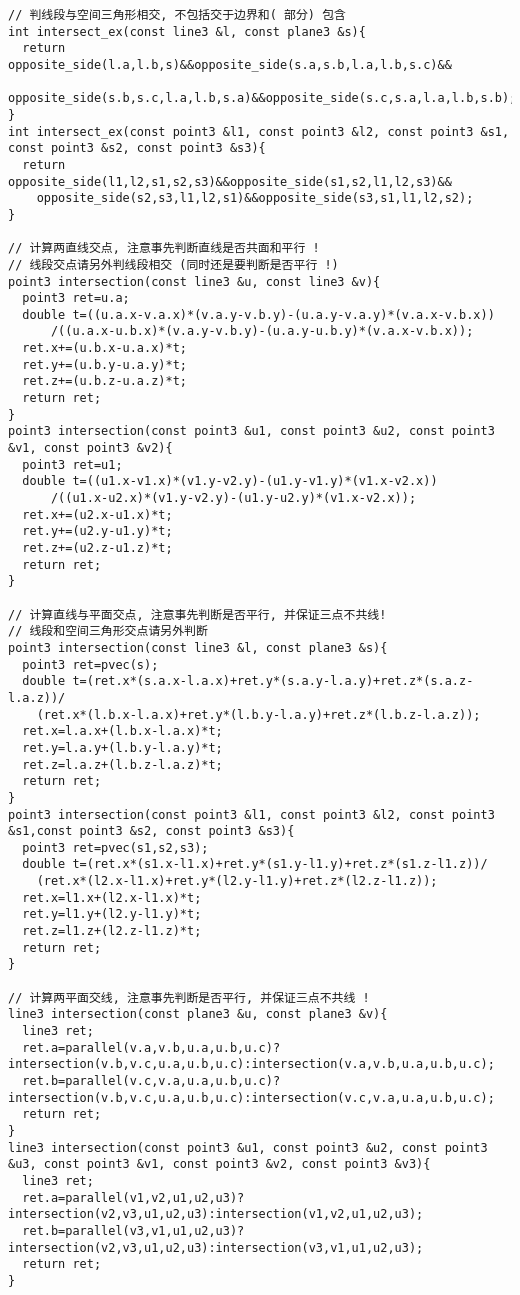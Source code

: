 \begin{lstlisting}[language={}]
// 判线段与空间三角形相交, 不包括交于边界和( 部分) 包含
int intersect_ex(const line3 &l, const plane3 &s){
  return opposite_side(l.a,l.b,s)&&opposite_side(s.a,s.b,l.a,l.b,s.c)&&
    opposite_side(s.b,s.c,l.a,l.b,s.a)&&opposite_side(s.c,s.a,l.a,l.b,s.b);
}
int intersect_ex(const point3 &l1, const point3 &l2, const point3 &s1, const point3 &s2, const point3 &s3){
  return opposite_side(l1,l2,s1,s2,s3)&&opposite_side(s1,s2,l1,l2,s3)&&
    opposite_side(s2,s3,l1,l2,s1)&&opposite_side(s3,s1,l1,l2,s2);
}

// 计算两直线交点, 注意事先判断直线是否共面和平行 !
// 线段交点请另外判线段相交 (同时还是要判断是否平行 !)
point3 intersection(const line3 &u, const line3 &v){
  point3 ret=u.a;
  double t=((u.a.x-v.a.x)*(v.a.y-v.b.y)-(u.a.y-v.a.y)*(v.a.x-v.b.x))
      /((u.a.x-u.b.x)*(v.a.y-v.b.y)-(u.a.y-u.b.y)*(v.a.x-v.b.x));
  ret.x+=(u.b.x-u.a.x)*t;
  ret.y+=(u.b.y-u.a.y)*t;
  ret.z+=(u.b.z-u.a.z)*t;
  return ret;
}
point3 intersection(const point3 &u1, const point3 &u2, const point3 &v1, const point3 &v2){
  point3 ret=u1;
  double t=((u1.x-v1.x)*(v1.y-v2.y)-(u1.y-v1.y)*(v1.x-v2.x))
      /((u1.x-u2.x)*(v1.y-v2.y)-(u1.y-u2.y)*(v1.x-v2.x));
  ret.x+=(u2.x-u1.x)*t;
  ret.y+=(u2.y-u1.y)*t;
  ret.z+=(u2.z-u1.z)*t;
  return ret;
}

// 计算直线与平面交点, 注意事先判断是否平行, 并保证三点不共线!
// 线段和空间三角形交点请另外判断
point3 intersection(const line3 &l, const plane3 &s){
  point3 ret=pvec(s);
  double t=(ret.x*(s.a.x-l.a.x)+ret.y*(s.a.y-l.a.y)+ret.z*(s.a.z-l.a.z))/
    (ret.x*(l.b.x-l.a.x)+ret.y*(l.b.y-l.a.y)+ret.z*(l.b.z-l.a.z));
  ret.x=l.a.x+(l.b.x-l.a.x)*t;
  ret.y=l.a.y+(l.b.y-l.a.y)*t;
  ret.z=l.a.z+(l.b.z-l.a.z)*t;
  return ret;
}
point3 intersection(const point3 &l1, const point3 &l2, const point3 &s1,const point3 &s2, const point3 &s3){
  point3 ret=pvec(s1,s2,s3);
  double t=(ret.x*(s1.x-l1.x)+ret.y*(s1.y-l1.y)+ret.z*(s1.z-l1.z))/
    (ret.x*(l2.x-l1.x)+ret.y*(l2.y-l1.y)+ret.z*(l2.z-l1.z));
  ret.x=l1.x+(l2.x-l1.x)*t;
  ret.y=l1.y+(l2.y-l1.y)*t;
  ret.z=l1.z+(l2.z-l1.z)*t;
  return ret;
}

// 计算两平面交线, 注意事先判断是否平行, 并保证三点不共线 !
line3 intersection(const plane3 &u, const plane3 &v){
  line3 ret;
  ret.a=parallel(v.a,v.b,u.a,u.b,u.c)?intersection(v.b,v.c,u.a,u.b,u.c):intersection(v.a,v.b,u.a,u.b,u.c);
  ret.b=parallel(v.c,v.a,u.a,u.b,u.c)?intersection(v.b,v.c,u.a,u.b,u.c):intersection(v.c,v.a,u.a,u.b,u.c);
  return ret;
}
line3 intersection(const point3 &u1, const point3 &u2, const point3 &u3, const point3 &v1, const point3 &v2, const point3 &v3){
  line3 ret;
  ret.a=parallel(v1,v2,u1,u2,u3)?intersection(v2,v3,u1,u2,u3):intersection(v1,v2,u1,u2,u3);
  ret.b=parallel(v3,v1,u1,u2,u3)?intersection(v2,v3,u1,u2,u3):intersection(v3,v1,u1,u2,u3);
  return ret;
}


\end{lstlisting}
